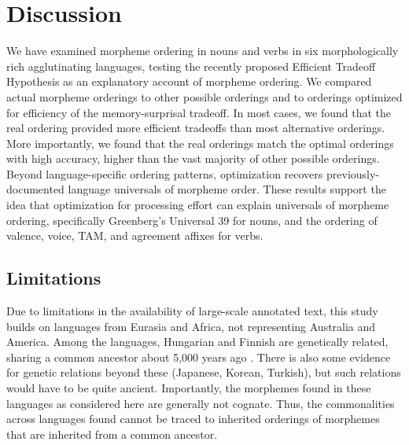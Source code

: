 \documentclass[man]{apa7}
\newcommand{\citep}{\parencite}
\begin{document}
\section{Discussion}\label{sec:discussion}



We have examined morpheme ordering in nouns and verbs in six morphologically rich agglutinating languages, testing the recently proposed Efficient Tradeoff Hypothesis \citep{Hahn2020modeling} as an explanatory account of morpheme ordering.
We compared actual morpheme orderings to other possible orderings and to orderings optimized for efficiency of the memory-surprisal tradeoff.
In most cases, we found that the real ordering provided more efficient tradeoffs than most alternative orderings.
More importantly, we found that the real orderings match the optimal orderings with high accuracy, higher than the vast majority of other possible orderings.
Beyond language-specific ordering patterns, optimization recovers previously-documented language universals of morpheme order.
These results support the idea that optimization for processing effort can explain universals of morpheme ordering, specifically Greenberg's Universal 39 for nouns, and the ordering of valence, voice, TAM, and agreement affixes for verbs.





\subsection{Limitations}

Due to limitations in the availability of large-scale annotated text, this study builds on languages from Eurasia and Africa, not representing Australia and America.
Among the languages, Hungarian and Finnish are genetically related, sharing a common ancestor about 5,000 years ago \citep{maurits2020best}.
There is also some evidence for genetic relations beyond these (Japanese, Korean, Turkish), but such relations would have to be quite ancient.
Importantly, the morphemes found in these languages as considered here are generally not cognate.
Thus, the commonalities across languages found cannot be traced to inherited orderings of morphemes that are inherited from a common ancestor.
\end{document}
